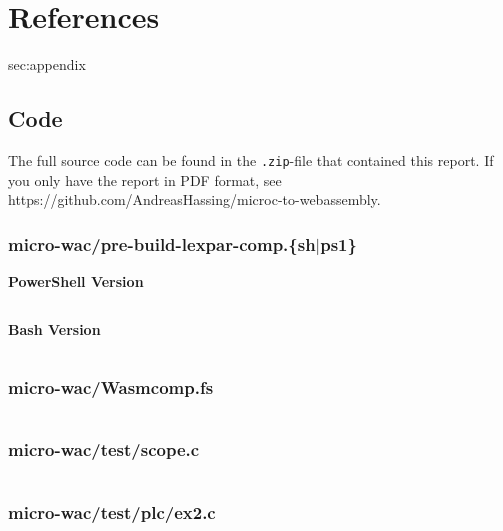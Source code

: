 \documentclass[a4paper]{article}
\begin{document}
\section{References}
\label{sec:references}
\begingroup
\renewcommand{\section}[2]{}%

{}
\endgroup

\newpage
\section{Appendix}
\label{sec:appendix}

\subsection{Code}
\label{sec:appendix:code}
The full source code can be found in the \texttt{.zip}-file that contained this report. If you only have the report in PDF format, see https://github.com/AndreasHassing/microc-to-webassembly.

\subsubsection{micro-wac/pre-build-lexpar-comp.\{sh$|$ps1\}}
\label{sec:appendix:code:pre-build-lexpar-comp}
\textbf{PowerShell Version}
\inputminted[breaklines,tabsize=2,linenos]{powershell}{../micro-wac/pre-build-lexpar-comp.ps1}

\newpage
\noindent\textbf{Bash Version}
\inputminted[breaklines,tabsize=2,linenos]{bash}{../micro-wac/pre-build-lexpar-comp.sh}

\newpage
\subsubsection{micro-wac/Wasmcomp.fs}
\label{sec:appendix:code:Wasmcomp.fs}
\inputminted[breaklines,tabsize=2,linenos]{fsharp}{../micro-wac/Wasmcomp.fs}

\newpage
\subsubsection{micro-wac/test/scope.c}
\label{sec:appendix:code:test-scope.c}
\inputminted[breaklines,tabsize=2,linenos]{c}{../micro-wac/test/scope.c}

\newpage
\subsubsection{micro-wac/test/plc/ex2.c}
\label{sec:appendix:code:plc-ex2.c}
\inputminted[breaklines,tabsize=2,linenos]{c}{../micro-wac/test/plc/ex2.c}
\end{document}
